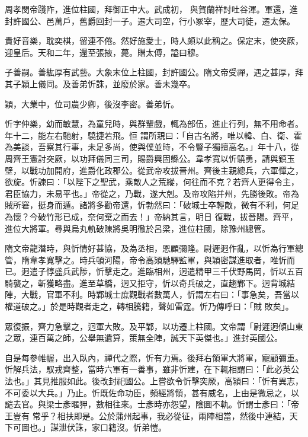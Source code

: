 \begin{pinyinscope}
 周孝閔帝踐阼，進位柱國，拜御正中大。武成初，
 與賀蘭祥討吐谷渾。軍還，進封許國公、邑萬戶，舊爵回封一子。遷大司空，行小冢宰，歷大司徒，遷太保。



 貴好音樂，耽奕棋，留連不倦。然好施愛士，時人頗以此稱之。保定末，使突厥，迎皇后。天和二年，還至張掖，薨。贈太傅，謚曰穆。



 子善嗣。善紘厚有武藝。大象末位上柱國，封許國公。隋文帝受禪，遇之甚厚，拜其子穎上儀同。及善弟忻誅，並廢於家。善未幾卒。



 穎，大業中，位司農少卿，後沒李密。善弟忻。



 忻字仲樂，幼而敏慧，為童兒時，與群輩戲，輒為部伍，進止行列，無不用命者。年十二，能左右馳射，驍捷若飛。恒
 謂所親曰：「自古名將，唯以韓、白、衛、霍為美談，吾察其行事，未足多尚，使與僕並時，不令豎子獨擅高名。」年十八，從周齊王憲討突厥，以功拜儀同三司，賜爵興固縣公。韋孝寬以忻驍勇，請與鎮玉壁，以戰功加開府，進爵化政郡公。從武帝攻拔晉州。齊後主親總兵，六軍憚之，欲旋。忻諫曰：「以陛下之聖武，乘敵人之荒縱，何往而不克？若齊人更得令主，君臣協力，未易平也。」帝從之，乃戰，遂大剋。及帝攻陷并州，先勝後敗。帝為賊所窘，挺身而遁。諸將多勸帝還，忻勃然曰：「破城士卒輕敵，微有不利，何足為懷？今破竹形已成，奈何棄之而去！」帝納其言，明日
 復戰，拔晉陽。齊平，進位大將軍。尋與烏丸軌破陳將吳明徹於呂梁，進位柱國，除豫州總管。



 隋文帝龍潛時，與忻情好甚協，及為丞相，恩顧彌隆。尉遲迥作亂，以忻為行軍總管，隋韋孝寬擊之。時兵頓河陽，帝令高熲馳驛監軍，與穎密謀進取者，唯忻而已。迥遣子惇盛兵武陟，忻擊走之。進臨相州，迥遣精甲三千伏野馬岡，忻以五百騎襲之，斬獲略盡。進至草橋，迥又拒守，忻以奇兵破之，直趨鄴下。迥背城結陣，大戰，官軍不利。時鄴城士庶觀戰者數萬人，忻謂左右曰：「事急矣，吾當以權道破之。」於是時觀者走之，轉相騰籍，聲如雷霆。忻乃傳呼曰：「賊
 敗矣」。



 眾復振，齊力急擊之，迥軍大敗。及平鄴，以功遷上柱國。文帝謂「尉遲迥傾山東之眾，連百萬之師，公舉無遺算，策無全陣，誠天下英傑也。」進封英國公。



 自是每參帷幄，出入臥內，禪代之際，忻有力焉。後拜右領軍大將軍，寵顧彌重。忻解兵法，馭戎齊整，當時六軍有一善事，雖非忻建，在下輒相謂曰：「此必英公法也。」其見推服如此。後改封祀國公。上嘗欲令忻擊突厥，高潁曰：「忻有異志，不可委以大兵。」乃止。忻既佐命功臣，頻經將領，甚有威名，上由是微忌之，以譴去官。與梁士彥暱狎，數相往來。士彥時亦怨望，陰圖不軌。忻謂士彥曰：「帝王豈有
 常乎？相扶即是。公於蒲州起事，我必從征，兩陣相當，然後中連結，天下可圖也。」謀泄伏誅，家口籍沒。忻弟愷。




\end{pinyinscope}
